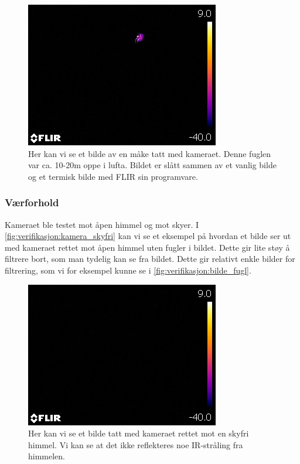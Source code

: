 \begin{figure}[H]
    \centering
    \includegraphics[width=.5\textwidth]{verifikasjon-test/Kamera/FLIR0059.jpg}
    \caption{Her kan vi se et bilde av en måke tatt med kameraet. Denne fuglen var ca. 10-20m oppe i lufta. Bildet er slått sammen av et vanlig bilde og et termisk bilde med FLIR sin programvare.}
    \label{fig:verifikasjon:bilde_fugl}
\end{figure}

\subsubsection{Værforhold}\label{sec:verifikasjon:kamera:værforhold}

Kameraet ble testet mot åpen himmel og mot skyer. 
I \autoref{fig:verifikasjon:kamera_skyfri} kan vi se et eksempel på hvordan et bilde ser ut med kameraet rettet mot åpen himmel uten fugler i bildet. 
Dette gir lite støy å filtrere bort, som man tydelig kan se fra bildet. 
Dette gir relativt enkle bilder for filtrering, som vi for eksempel kunne se i \autoref{fig:verifikasjon:bilde_fugl}. 


\begin{figure}[H]
    \centering
    \includegraphics[width=.5\textwidth]{verifikasjon-test/Kamera/skyfri.jpg}
    \caption{Her kan vi se et bilde tatt med kameraet rettet mot en skyfri himmel. Vi kan se at det ikke reflekteres noe IR-stråling fra himmelen.}
    \label{fig:verifikasjon:kamera_skyfri}
\end{figure}

